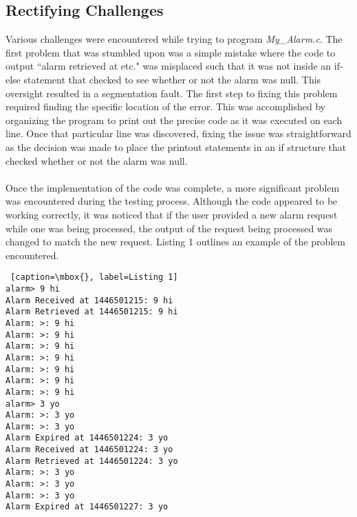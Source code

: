 \documentclass[11pt]{article}
\newcommand{\forceindent}{\leavevmode{\parindent=1em\indent}}
\begin{document}
	\subsection{Rectifying Challenges}
\forceindent Various challenges were encountered while trying to program \emph{My\_Alarm.c}. The first problem that was stumbled upon was a simple mistake where the code to output ``alarm retrieved at etc." was misplaced such that it was not inside an if-else statement that checked to see whether or not the alarm was null. This oversight resulted in a segmentation fault. The first step to fixing this problem required finding the specific location of the error. This was accomplished by organizing the program to print out the precise code as it was executed on each line. Once that particular line was discovered, fixing the issue was straightforward as the decision was made to place the printout statements in an if structure that checked whether or not the alarm was null. \\
\\
\forceindent Once the implementation of the code was complete, a more significant problem was encountered during the testing process. Although the code appeared to be working correctly, it was noticed that if the user provided a new alarm request while one was being processed, the output of the request being processed was changed to match the new request. Listing 1 outlines an example of the problem encountered. 

\lstset{language=C}        

\begin{lstlisting} [caption=\mbox{}, label=Listing 1]
alarm> 9 hi
Alarm Received at 1446501215: 9 hi
Alarm Retrieved at 1446501215: 9 hi
Alarm: >: 9 hi
Alarm: >: 9 hi
Alarm: >: 9 hi
Alarm: >: 9 hi
Alarm: >: 9 hi
Alarm: >: 9 hi
Alarm: >: 9 hi
alarm> 3 yo
Alarm: >: 3 yo
Alarm: >: 3 yo
Alarm Expired at 1446501224: 3 yo
Alarm Received at 1446501224: 3 yo
Alarm Retrieved at 1446501224: 3 yo
Alarm: >: 3 yo
Alarm: >: 3 yo
Alarm: >: 3 yo
Alarm Expired at 1446501227: 3 yo
\end{lstlisting}
\end{document}
